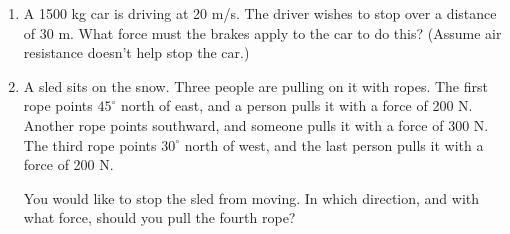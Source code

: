 \documentclass[12pt]{article}
\begin{document}
\begin{enumerate}
 \item{A 1500 kg car is driving at 20 m/s. The driver wishes to stop over a distance of 30 m. What force must the brakes apply to the car to do this? (Assume air resistance doesn't help stop the car.)}
%
%
%
%
%
%
%

\item A sled sits on the snow. Three people are pulling on it with ropes. The first rope points $45^\circ$ north of east, and a person pulls it with a force of 200 N.
Another rope points southward, and someone pulls it with a force of 300 N. The third rope points $30^\circ$ north of west, and the last person pulls it with a force of
200 N.

You would like to stop the sled from moving. In which direction, and with what force, should you pull the fourth rope?


\end{enumerate}
\end{document}
